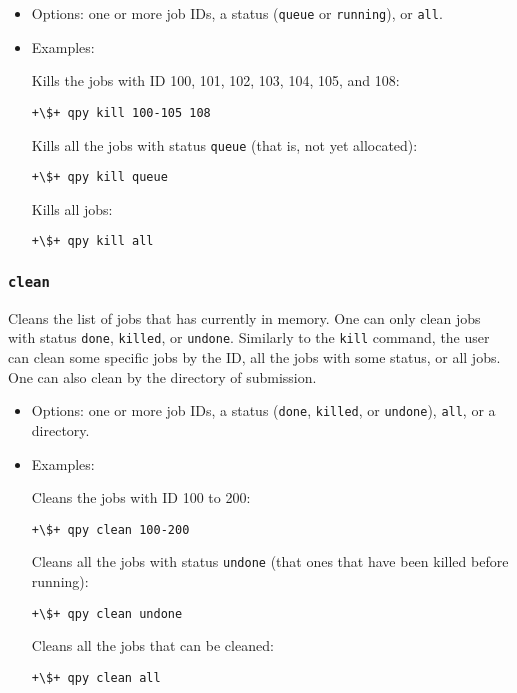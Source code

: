 \documentclass[a4paper,12pt]{article}
\begin{document}
\begin{itemize}
\item Options:
  one or more job IDs, a status (\texttt{queue} or \texttt{running}), or \texttt{all}.

\item Examples:

  Kills the jobs with ID 100, 101, 102, 103, 104, 105, and 108:

  \begin{lstlisting}[style=BashStyle]
+\$+ qpy kill 100-105 108
  \end{lstlisting}

  Kills all the jobs with status \texttt{queue} (that is, not yet allocated):

  \begin{lstlisting}[style=BashStyle]
+\$+ qpy kill queue
  \end{lstlisting}

  Kills all jobs:

  \begin{lstlisting}[style=BashStyle]
+\$+ qpy kill all
  \end{lstlisting}
\end{itemize}

\subsubsection{\texttt{clean}}

Cleans the list of jobs that \qpy{} has currently in memory.
One can only clean jobs with status \texttt{done}, \texttt{killed}, or \texttt{undone}.
Similarly to the \texttt{kill} command, the user can clean some specific jobs by the ID, all the jobs with some status, or all jobs.
One can also clean by the directory of submission.


\begin{itemize}
\item Options:
  one or more job IDs, a status (\texttt{done}, \texttt{killed}, or \texttt{undone}), \texttt{all}, or a directory.

\item Examples:

  Cleans the jobs with ID 100 to 200:

  \begin{lstlisting}[style=BashStyle]
+\$+ qpy clean 100-200
  \end{lstlisting}

  Cleans all the jobs with status \texttt{undone} (that ones that have been killed before running):

  \begin{lstlisting}[style=BashStyle]
+\$+ qpy clean undone
  \end{lstlisting}

  Cleans all the jobs that can be cleaned:

  \begin{lstlisting}[style=BashStyle]
+\$+ qpy clean all
  \end{lstlisting}
\end{itemize}
\end{document}
